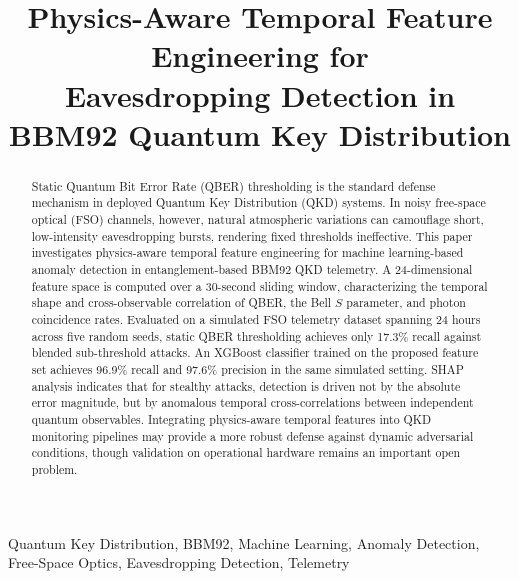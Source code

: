 \documentclass[conference]{IEEEtran}
\begin{document}
\title{Physics-Aware Temporal Feature Engineering for\\
Eavesdropping Detection in BBM92 Quantum Key Distribution}

\author{
}
\maketitle

\begin{abstract}
Static Quantum Bit Error Rate (QBER) thresholding is the standard defense mechanism in deployed Quantum Key Distribution (QKD) systems. In noisy free-space optical (FSO) channels, however, natural atmospheric variations can camouflage short, low-intensity eavesdropping bursts, rendering fixed thresholds ineffective. This paper investigates physics-aware temporal feature engineering for machine learning-based anomaly detection in entanglement-based BBM92 QKD telemetry. A 24-dimensional feature space is computed over a 30-second sliding window, characterizing the temporal shape and cross-observable correlation of QBER, the Bell $S$ parameter, and photon coincidence rates. Evaluated on a simulated FSO telemetry dataset spanning 24 hours across five random seeds, static QBER thresholding achieves only 17.3\% recall against blended sub-threshold attacks. An XGBoost classifier trained on the proposed feature set achieves 96.9\% recall and 97.6\% precision in the same simulated setting. SHAP analysis indicates that for stealthy attacks, detection is driven not by the absolute error magnitude, but by anomalous temporal cross-correlations between independent quantum observables. Integrating physics-aware temporal features into QKD monitoring pipelines may provide a more robust defense against dynamic adversarial conditions, though validation on operational hardware remains an important open problem.
\end{abstract}

\begin{IEEEkeywords}
Quantum Key Distribution, BBM92, Machine Learning, Anomaly Detection, Free-Space Optics, Eavesdropping Detection, Telemetry
\end{IEEEkeywords}
\end{document}

